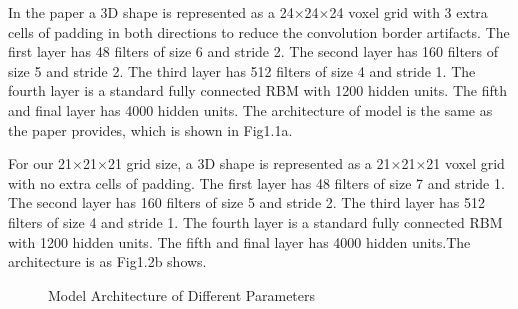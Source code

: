 \documentclass[11pt,journal,compsoc]{IEEEtran}
\begin{document}
  In the paper a 3D shape is represented as a 24$\times$24$\times$24 voxel grid with 3 extra cells of padding in both directions to reduce the convolution border artifacts. The first layer has 48 filters of size 6 and stride 2. The second layer has 160 filters of size 5 and stride 2. The third layer has 512 filters of size 4 and stride 1. The fourth layer is a standard fully connected RBM with 1200 hidden units. The fifth and final layer has 4000 hidden units. 
  The architecture of model is the same as the paper provides, which is shown in Fig1.1a.

  For our 21$\times$21$\times$21 grid size, a 3D shape is represented as a 21$\times$21$\times$21 voxel grid with no extra cells of padding. The first layer has 48 filters of size 7 and stride 1. The second layer has 160 filters of size 5 and stride 2. The third layer has 512 filters of size 4 and stride 1. The fourth layer is a standard fully connected RBM with 1200 hidden units. The fifth and final layer has 4000 hidden units.The architecture is as Fig1.2b shows.

  \begin{figure}[htbp]
    \centering
    \caption{Model Architecture of Different Parameters}
  \end{figure}
\end{document}
